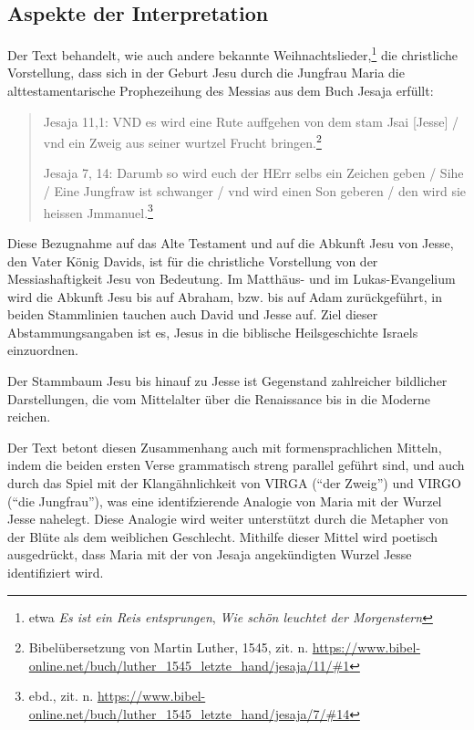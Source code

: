 \documentclass[a4paper]{book}
\begin{document}
\begin{samepage}

\subsection{Aspekte der Interpretation}

\begin{multicols}{2}

Der Text behandelt, wie auch andere bekannte Weihnachtslieder,\footnote{etwa \emph{Es ist ein Reis entsprungen}, \emph{Wie schön leuchtet der Morgenstern}} die christliche Vorstellung, dass sich in der Geburt Jesu durch die Jungfrau Maria die alttestamentarische Prophezeihung des Messias aus dem Buch Jesaja erfüllt: 

\begin{quote}
Jesaja 11,1: VND es wird eine Rute auffgehen von dem stam Jsai [Jesse] / vnd ein Zweig aus seiner wurtzel Frucht bringen.\footnote{Bibelübersetzung von Martin Luther, 1545, zit. n. \url{https://www.bibel-online.net/buch/luther_1545_letzte_hand/jesaja/11/\#1}}

Jesaja 7, 14: Darumb so wird euch der HErr selbs ein Zeichen geben / Sihe / Eine Jungfraw ist schwanger / vnd wird einen Son geberen / den wird sie heissen Jmmanuel.\footnote{ebd., zit. n. \url{https://www.bibel-online.net/buch/luther_1545_letzte_hand/jesaja/7/\#14}}
\end{quote}

Diese Bezugnahme auf das Alte Testament und auf die Abkunft Jesu von Jesse, den Vater König Davids, ist für die christliche Vorstellung von der Messiashaftigkeit Jesu von Bedeutung. Im Matthäus- und im Lukas-Evangelium wird die Abkunft Jesu bis auf Abraham, bzw. bis auf Adam zurückgeführt, in beiden Stammlinien tauchen auch David und Jesse auf. Ziel dieser Abstammungsangaben ist es, Jesus in die biblische Heilsgeschichte Israels einzuordnen. 

Der Stammbaum Jesu bis hinauf zu Jesse ist Gegenstand zahlreicher bildlicher Darstellungen, die vom Mittelalter über die Renaissance bis in die Moderne reichen.

Der Text betont diesen Zusammenhang auch mit formensprachlichen Mitteln, indem die beiden ersten Verse grammatisch streng parallel geführt sind, und auch durch das Spiel mit der Klangähnlichkeit von VIRGA (\enquote{der Zweig}) und VIRGO (\enquote{die Jungfrau}), was eine identifzierende Analogie von Maria mit der Wurzel Jesse nahelegt. Diese Analogie wird weiter unterstützt durch die Metapher von der Blüte als dem weiblichen Geschlecht. Mithilfe dieser Mittel wird poetisch ausgedrückt, dass Maria mit der von Jesaja angekündigten Wurzel Jesse identifiziert wird.

\end{multicols}

\end{samepage}
\end{document}
